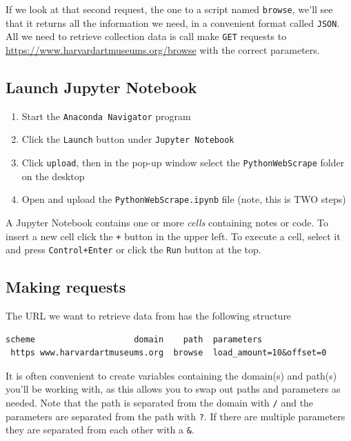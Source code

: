 \documentclass[]{book}
\providecommand{\tightlist}{%
  \setlength{\itemsep}{0pt}\setlength{\parskip}{0pt}}
\begin{document}
If we look at that second request, the one to a script named
\texttt{browse}, we'll see that it returns all the information we need, in
a convenient format called \texttt{JSON}. All we need to retrieve collection
data is call make \texttt{GET} requests to
\url{https://www.harvardartmuseums.org/browse} with the correct
parameters.

\hypertarget{launch-jupyter-notebook-1}{%
\subsection{Launch Jupyter Notebook}\label{launch-jupyter-notebook-1}}

\begin{enumerate}
\def\labelenumi{\arabic{enumi}.}
\tightlist
\item
  Start the \texttt{Anaconda\ Navigator} program
\item
  Click the \texttt{Launch} button under \texttt{Jupyter\ Notebook}
\item
  Click \texttt{upload}, then in the pop-up window select the \texttt{PythonWebScrape} folder on the desktop
\item
  Open and upload the \texttt{PythonWebScrape.ipynb} file (note, this is TWO steps)
\end{enumerate}

A Jupyter Notebook contains one or more \emph{cells} containing notes or code. To insert a new cell click the \texttt{+} button in the upper left. To execute a cell, select it and press \texttt{Control+Enter} or click the \texttt{Run} button at the top.

\hypertarget{making-requests}{%
\subsection{Making requests}\label{making-requests}}

The URL we want to retrieve data from has the following structure

\begin{verbatim}
scheme                    domain    path  parameters
 https www.harvardartmuseums.org  browse  load_amount=10&offset=0
\end{verbatim}

It is often convenient to create variables containing the domain(s)
and path(s) you'll be working with, as this allows you to swap out
paths and parameters as needed. Note that the path is separated from
the domain with \texttt{/} and the parameters are separated from the path
with \texttt{?}. If there are multiple parameters they are separated from
each other with a \texttt{\&}.
\end{document}
